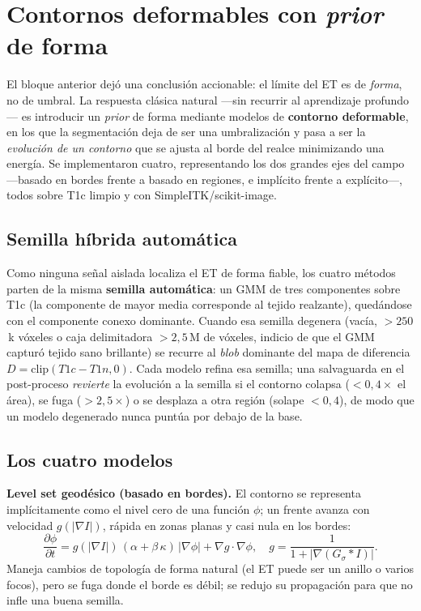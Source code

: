 \documentclass[conference]{IEEEtran}
\begin{document}
\section{Contornos deformables con \emph{prior} de forma}
\label{sec:deformables}
El bloque anterior dejó una conclusión accionable: el límite del ET es de
\emph{forma}, no de umbral. La respuesta clásica natural ---sin recurrir al
aprendizaje profundo--- es introducir un \emph{prior} de forma mediante
modelos de \textbf{contorno deformable}, en los que la segmentación deja de
ser una umbralización y pasa a ser la \emph{evolución de un contorno} que se
ajusta al borde del realce minimizando una energía. Se implementaron cuatro,
representando los dos grandes ejes del campo ---basado en bordes frente a
basado en regiones, e implícito frente a explícito---, todos sobre T1c limpio
y con SimpleITK/scikit-image.

\subsection{Semilla híbrida automática}
Como ninguna señal aislada localiza el ET de forma fiable, los cuatro métodos
parten de la misma \textbf{semilla automática}: un GMM de tres componentes
sobre T1c (la componente de mayor media corresponde al tejido realzante),
quedándose con el componente conexo dominante. Cuando esa semilla degenera
(vacía, $>250$\,k vóxeles o caja delimitadora $>2{,}5$\,M de vóxeles, indicio
de que el GMM capturó tejido sano brillante) se recurre al \emph{blob}
dominante del mapa de diferencia $D=\mathrm{clip}(T1c-T1n,0)$. Cada modelo
refina esa semilla; una salvaguarda en el post-proceso \emph{revierte} la
evolución a la semilla si el contorno colapsa ($<0{,}4\times$ el área),
se fuga ($>2{,}5\times$) o se desplaza a otra región (solape $<0{,}4$), de
modo que un modelo degenerado nunca puntúa por debajo de la base.

\subsection{Los cuatro modelos}
\textbf{Level set geodésico (basado en bordes).} El contorno se representa
implícitamente como el nivel cero de una función $\phi$; un frente avanza con
velocidad $g(|\nabla I|)$, rápida en zonas planas y casi nula en los bordes:
\begin{equation}
\frac{\partial \phi}{\partial t}=
g(|\nabla I|)\,(\alpha+\beta\,\kappa)\,|\nabla\phi| + \nabla g\cdot\nabla\phi,
\quad g=\frac{1}{1+|\nabla (G_\sigma * I)|}.
\end{equation}
Maneja cambios de topología de forma natural (el ET puede ser un anillo o
varios focos), pero se fuga donde el borde es débil; se redujo su propagación
para que no infle una buena semilla.
\end{document}
